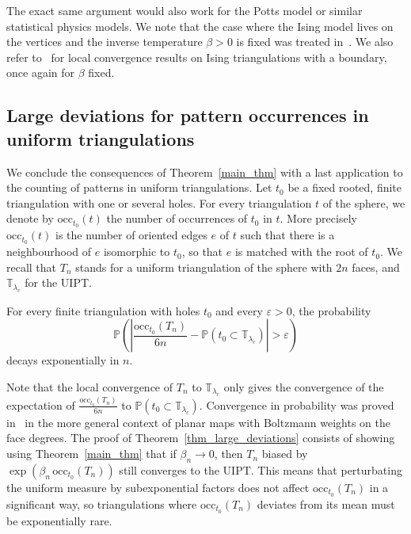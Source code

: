 \documentclass[AHL,Unicode,longabstracts,published]{cedram}
\newcommand{\eps}{\varepsilon}
\newcommand{\TT}{\mathbb{T}}
\renewcommand{\P}{\mathbb{P}}
\newcommand{\occ}{\mathrm{occ}}
\begin{document}
The exact same argument would also work for the Potts model or similar statistical physics models. We note that the case where the Ising model lives on the vertices and the inverse temperature $\beta>0$ is fixed was treated in~\cite{AMS20}. We also refer to~\cite{CT20, CT20b, CT20c} for local convergence results on Ising triangulations with a boundary, once again for $\beta$ fixed.

\subsection*{Large deviations for pattern occurrences in uniform triangulations}
We conclude the consequences of Theorem~\ref{main_thm} with a last application to the counting of patterns in uniform triangulations. Let $t_0$ be a fixed rooted, finite triangulation with one or several holes. For every triangulation $t$ of the sphere, we denote by $\occ_{t_0}(t)$ the number of occurrences of $t_0$ in $t$. More precisely $\occ_{t_0}(t)$ is the number of oriented edges $e$ of $t$ such that there is a neighbourhood of $e$ isomorphic to $t_0$, so that $e$ is matched with the root of $t_0$. We recall that $T_n$ stands for a uniform triangulation of the sphere with $2n$ faces, and $\TT_{\lambda_c}$ for the UIPT.

\begin{theo}\label{thm_large_deviations}
For every finite triangulation with holes $t_0$ and every $\eps>0$, the probability
\[
\P \left(\left| \frac{\occ_{t_0}(T_n)}{6n} - \P \left(t_0 \subset \TT_{\lambda_c} \right) \right|> \eps \right)
\]
decays exponentially in $n$.
\end{theo}

Note that the local convergence of $T_n$ to $\TT_{\lambda_c}$ only gives the convergence of the expectation of $\frac{\occ_{t_0}(T_n)}{6n}$ to $\P (t_0 \subset \TT_{\lambda_c})$. Convergence in probability was proved in~\cite{BD18} in the more general context of planar maps with Boltzmann weights on the face degrees. The proof of Theorem~\ref{thm_large_deviations} consists of showing using Theorem~\ref{main_thm} that if $\beta_n \to 0$, then $T_n$ biased by $\exp (\beta_n \, \occ_{t_0}(T_n))$ still converges to the UIPT. This means that perturbating the uniform measure by subexponential factors does not affect $\occ_{t_0}(T_n)$ in a significant way, so triangulations where $\occ_{t_0}(T_n)$ deviates from its mean must be exponentially rare.
\end{document}
